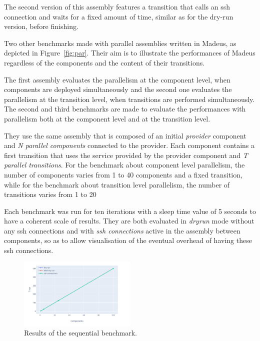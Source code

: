 The second version of this assembly features a transition that calls
an ssh connection and waits for a fixed amount of time, similar as for
the dry-run version, before finishing.

Two other benchmarks made with parallel assemblies written in Madeus,
as depicted in Figure~\ref{fig:par}.  Their aim is to illustrate the
performances of Madeus regardless of the components and the content of
their transitions.

The first assembly evaluates the parallelism at the component level,
when components are deployed simultaneously and the second one
evaluates the parallelism at the transition level, when transitions
are performed simultaneously.  The second and third benchmarks are
made to evaluate the performances with parallelism both at the
component level and at the transition level.

They use the same assembly that is composed of an initial
\emph{provider} component and \emph{N parallel components} connected
to the provider. Each component contains a first transition that uses
the service provided by the provider component and \emph{T parallel
  transitions}. For the benchmark about component level parallelism,
the number of components varies from 1 to 40 components and a fixed
transition, while for the benchmark about transition level
parallelism, the number of transitions varies from 1 to
20 %

Each benchmark was run for ten iterations with a sleep time value of 5
seconds to have a coherent scale of results. They are both evaluated
in \emph{dryrun} mode without any ssh connections and with \emph{ssh
  connections} active in the assembly between components, so as to
allow visualisation of the eventual overhead of having these ssh
connections.

\begin{figure}[h]
  \begin{center} 
    \includegraphics[width=0.5\textwidth]{./images/evaluations_sequential.pdf}
    \caption{Results of the sequential benchmark.}
    \label{fig:seqres}
  \end{center}
\end{figure}

